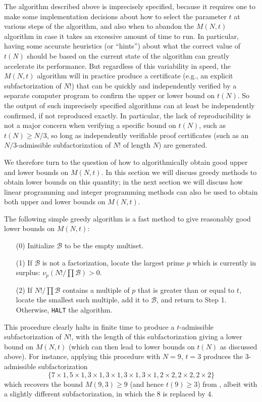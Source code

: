 \documentclass[12pt,a4paper,reqno]{amsart}
\numberwithin{equation}{section}
\theoremstyle{plain}
\theoremstyle{definition}
\newcommand\tuple{{\mathcal B}}
\begin{document}
The algorithm described above is imprecisely specified, because it requires one to make some implementation decisions about how to select the parameter $t$ at various steps of the algorithm, and also when to abandon the $M(N,t)$ algorithm in case it takes an excessive amount of time to run.  In particular, having some accurate heuristics (or ``hints'') about what the correct value of $t(N)$ should be based on the current state of the algorithm can greatly accelerate its performance.  But regardless of this variability in speed, the $M(N,t)$ algorithm will in practice produce a certificate (e.g., an explicit subfactorization of $N!$) that can be quickly and independently verified by a separate computer program to confirm the upper or lower bound on $t(N)$.  So the output of such imprecisely specified algorithms can at least be independently confirmed, if not reproduced exactly.  In particular, the lack of reproducibility is not a major concern when verifying a specific bound on $t(N)$, such as $t(N) \geq N/3$, so long as independently verifiable proof certificates (such as an $N/3$-admissible subfactorization of $N!$ of length $N$) are generated.

We therefore turn to the question of how to algorithmically obtain good upper and lower bounds on $M(N,t)$.  In this section we will discuss greedy methods to obtain lower bounds on this quantity; in the next section we will discuss how linear programming and integer programming methods can also be used to obtain both upper and lower bounds on $M(N,t)$.

The following simple greedy algorithm is a fast method to give reasonably good lower bounds on $M(N,t)$:

\begin{enumerate}
\item[(0)] Initialize $\tuple$ to be the empty multiset. 
\item[(1)] If $\tuple$ is not a factorization, locate the largest prime $p$ which is currently in surplus: $\nu_p(N!/\prod \tuple) > 0$. 
\item[(2)] If $N! / \prod \tuple$ contains a multiple of $p$ that is greater than or equal to $t$, locate the smallest such multiple, add it to $\tuple$, and return to Step 1.  Otherwise, \texttt{HALT} the algorithm. 
\end{enumerate}

This procedure clearly halts in finite time to produce a $t$-admissible subfactorization of $N!$, with the length of this subfactorization giving a lower bound on $M(N,t)$ (which can then lead to lower bounds on $t(N)$ as discussed above).  For instance, applying this procedure with $N=9$, $t=3$ produces the $3$-admissible subfactorization
$$ \{7 \times 1, 5 \times 1, 3 \times 1, 3 \times 1, 3 \times 1, 3 \times 1, 2 \times 2, 2 \times 2, 2 \times 2 \}$$
which recovers the bound $M(9,3) \geq 9$ (and hence $t(9) \geq 3$) from , albeit with a slightly different subfactorization, in which the $8$ is replaced by $4$.
\end{document}
